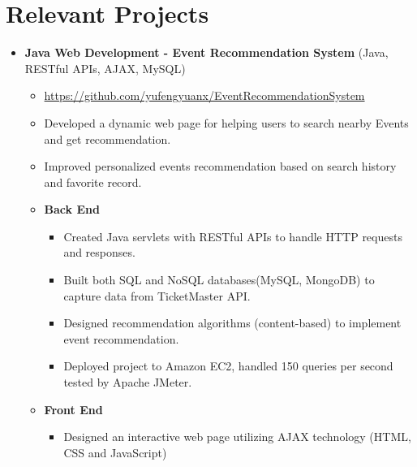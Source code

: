 \documentclass[letterpaper,10pt]{article}
\newcommand{\webSiteLink}[2]{#1\hspace{0.3em} \href{#2}{#2}}
\begin{document}
\section{Relevant Projects}
\begin{itemize}\setlength\itemindent{-0.2in}
	\item [] \textbf{Java Web Development - Event Recommendation System} (Java, RESTful APIs, AJAX, MySQL)
	\setlength\itemsep{0em}
	\begin{itemize}[topsep=-1em]
	\setlength\itemindent{-0.25in}  %
	\setlength\itemsep{-0.1em} %
		\item [] \webSiteLink{\faGithub}{https://github.com/yufengyuanx/EventRecommendationSystem}
		\item [\textbullet] Developed a dynamic web page for helping users to search nearby Events and get recommendation.
		\item [\textbullet] Improved personalized events recommendation based on search history and favorite record. \\
		
		\item [] \textbf{Back End}
			\begin{itemize}[topsep=-1em]
				\item[\textbullet] Created Java servlets with RESTful APIs to handle HTTP requests and responses.
				\item[\textbullet] Built both SQL and NoSQL databases(MySQL, MongoDB) to capture data from TicketMaster API.
				\item[\textbullet] Designed recommendation algorithms (content-based) to implement event recommendation.
				\item[\textbullet] Deployed project to Amazon EC2, handled 150 queries per second tested by Apache JMeter.
			\end{itemize}
		
		\item[] \textbf{Front End}
			\begin{itemize}[topsep=-1em]
				\item[\textbullet] Designed an interactive web page utilizing AJAX technology (HTML, CSS and JavaScript)
			\end{itemize}
	\end{itemize}


\end{itemize}
\end{document}

